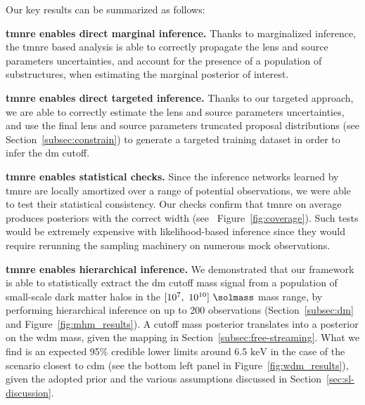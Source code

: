 \mbox{}

Our key results can be summarized as follows:

\noindent\textbf{\gls*{tmnre} enables direct marginal inference.} Thanks to marginalized inference, the \gls*{tmnre} based analysis is able to correctly propagate the lens and source parameters uncertainties, and  account for the presence of a population of substructures, when estimating the marginal posterior of interest.

\noindent\textbf{\gls*{tmnre} enables direct targeted inference.} Thanks to our targeted approach, we are able to correctly estimate the lens and source parameters uncertainties, and use the final lens and source parameters truncated proposal distributions (see Section~\ref{subsec:constrain}) to generate a targeted training dataset in order to infer the \gls*{dm} cutoff. 

\noindent\textbf{\gls*{tmnre} enables statistical checks.} Since the inference networks learned by \gls*{tmnre} are locally amortized over a range of potential observations, we were able to test their statistical consistency. Our checks confirm that \gls*{tmnre} on average produces posteriors with the correct width (see \eg~Figure~\ref{fig:coverage}). Such tests would be extremely expensive with likelihood-based inference since they would require rerunning the sampling machinery on numerous mock observations.
  
\noindent\textbf{\gls*{tmnre} enables hierarchical inference.} We demonstrated that our framework is able to statistically extract the \gls*{dm} cutoff mass signal from a population of small-scale dark matter halos in the $[10^7,\ 10^{10}]\ \si{\solmass}$ mass range, by performing hierarchical inference on up to 200 observations (Section~\ref{subsec:dm} and Figure~\ref{fig:mhm_results}). A cutoff mass posterior translates into a posterior on the \gls*{wdm} mass, given the mapping in Section~\ref{subsec:free-streaming}. What we find is an expected 95\% credible lower limits around 6.5 $\si{\keV}$ in the case of the scenario closest to \gls*{cdm} (see the bottom left panel in Figure~\ref{fig:wdm_results}), given the adopted prior and the various assumptions discussed in Section~\ref{sec:sl-discussion}. 

